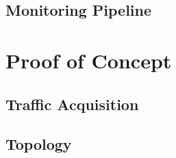 \subsection{Monitoring Pipeline}
\label{subsec:monitoring-pipeline}

\textcolor{dimgray}{\lipsum[1]}


\section{Proof of Concept}
\label{sec:poc}

\textcolor{dimgray}{\lipsum[1-10]}


\subsection{Traffic Acquisition}
\label{subsec:traffic-acquisition}

\textcolor{dimgray}{\lipsum}


\subsection{Topology}
\label{subsec:topology}

\textcolor{dimgray}{\lipsum}
